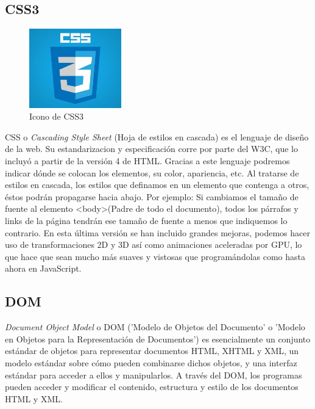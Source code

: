 \subsection{CSS3}
\begin{figure}[!h]
    \centering
    \includegraphics[width=40mm]{img/introduccion/css.jpg}
    \caption{Icono de CSS3}
\end{figure}
CSS o \textit{Cascading Style Sheet} (Hoja de estilos en cascada) es el lenguaje de diseño de la web.
Su estandarizacion y especificación corre por parte del W3C, que lo incluyó a partir de la versión 4 de HTML.
Gracias a este lenguaje podremos indicar dónde se colocan los elementos, su color, apariencia, etc.
Al tratarse de estilos en cascada, los estilos que definamos en un elemento que contenga a otros, éstos podrán propagarse hacia abajo. Por ejemplo: Si cambiamos el tamaño de fuente al elemento <body>(Padre de todo el documento), todos los párrafos y links de la página tendrán ese tamaño de fuente a menos que indiquemos lo contrario.
En esta última versión se han incluido grandes mejoras, podemos hacer uso de transformaciones 2D y 3D así como animaciones aceleradas por GPU, lo que hace que sean mucho más suaves y vistosas que programándolas como hasta ahora en JavaScript.
\subsection{DOM}
\textit{Document Object Model} o DOM ('Modelo de Objetos del Documento' o 'Modelo en Objetos para la Representación de Documentos') es esencialmente un conjunto estándar de objetos para representar documentos HTML, XHTML y XML, un modelo estándar sobre cómo pueden combinarse dichos objetos, y una interfaz estándar para acceder a ellos y manipularlos. A través del DOM, los programas pueden acceder y modificar el contenido, estructura y estilo de los documentos HTML y XML.


